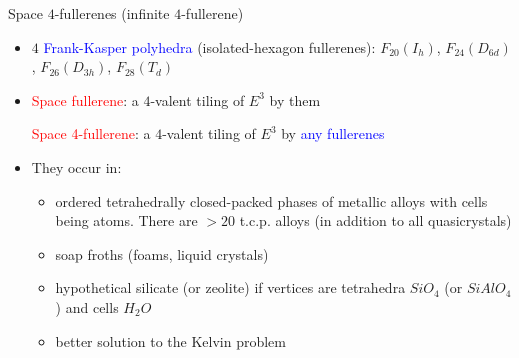 \documentclass[%
pdf,
colorBG,
slideColor,
]{prosper}
\begin{document}
\begin{slide}{Space $4$-fullerenes (infinite $4$-fullerene)}

\begin{itemize}
\item $4$ \textcolor{blue}{Frank-Kasper polyhedra}
(isolated-hexagon fullerenes): $F_{20}(I_h)$,
$F_{24}(D_{6d})$, $F_{26}(D_{3h})$, $F_{28}(T_d)$
\item \textcolor{red}{Space fullerene}: a $4$-valent tiling of
$E^3$ by them \par
\textcolor{red}{Space 4-fullerene}: a $4$-valent
tiling of $E^3$ by \textcolor{blue}{any fullerenes}
\item They occur in:
\begin{itemize}
\item ordered tetrahedrally closed-packed phases of metallic
alloys with cells being atoms. There are $>20$
t.c.p. alloys
(in addition to all quasicrystals)
\item soap froths (foams, liquid crystals)
\item hypothetical silicate (or zeolite) if vertices are
tetrahedra $SiO_4$ (or $SiAlO_4$) and cells $H_2O$
\item better solution to the Kelvin problem
\end{itemize}
\end{itemize}



\end{slide}
\end{document}
